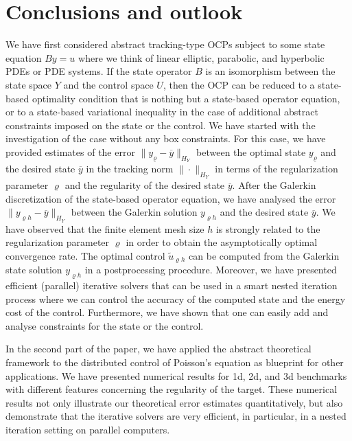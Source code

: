 \documentclass{article}
\numberwithin{equation}{section}
\begin{document}
\section{Conclusions and outlook}\label{Section:ConclusionOutlook}
We have first considered abstract tracking-type OCPs subject to some state 
equation $By=u$ where we think of linear elliptic, parabolic, and
hyperbolic PDEs or PDE systems. If the state operator $B$ is an isomorphism
between the state space $Y$ and the control space $U$, then the OCP can be
reduced to a state-based optimality condition that is nothing but a state-based
operator equation, or to a state-based variational inequality in the case of
additional abstract constraints imposed on the state or the
control. We have started with the investigation of the case without any box
constraints. For this case, we have provided estimates of the error 
$\|y_\varrho - \overline{y} \|_{H_Y}$ between the optimal state $y_\varrho$
and the desired state $\overline{y}$ in the tracking norm $\| \cdot \|_{H_Y}$
in terms of the regularization parameter $\varrho$ and the regularity of
the desired state $\overline{y}$. After the Galerkin discretization of the
state-based operator equation, we have analysed the error 
$\|{y}_{\varrho h} - \overline{y}\|_{H_Y}$ between the Galerkin solution 
${y}_{\varrho h}$ and the desired state $\overline{y}$. We have observed that
the finite element mesh size $h$ is strongly related to the
regularization parameter $\varrho$ in order to obtain the asymptotically
optimal convergence rate. The optimal control $\widetilde{u}_{\varrho h}$ 
can be computed from the Galerkin state solution ${y}_{\varrho h}$ in a
postprocessing procedure. Moreover, we have presented efficient (parallel)
iterative solvers that can be used in a smart nested iteration process 
where we can control the accuracy of the computed state and the energy cost
of the control. Furthermore, we have shown that one can easily add and
analyse constraints for the state or the control.

In the second part of the paper, we have applied the abstract theoretical
framework to the distributed control of Poisson's equation as blueprint
for other applications. We have presented numerical results for 1d, 2d, and
3d benchmarks with different features concerning the regularity of the target. 
These numerical results not only illustrate our theoretical error estimates
quantitatively, but also demonstrate that the iterative solvers are very
efficient, in particular, in a nested iteration setting on parallel computers. 
\end{document}
